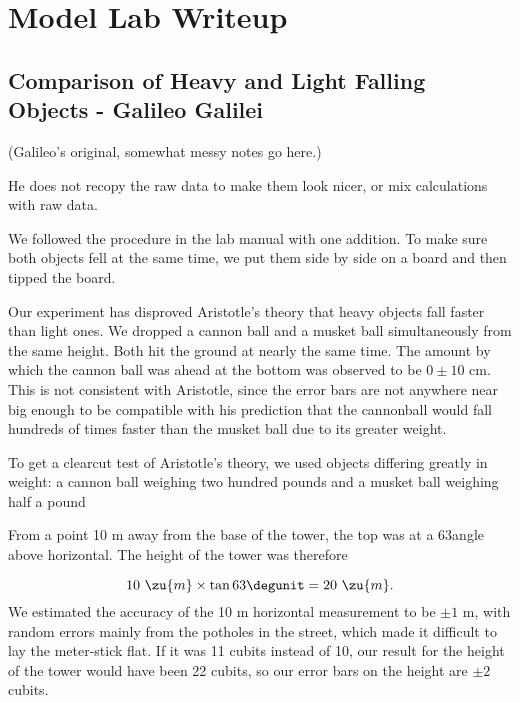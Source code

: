 \pagebreak[4]

\section*{Model Lab Writeup}

\subsection*{Comparison of Heavy and Light Falling Objects - Galileo Galilei}

(Galileo's original, somewhat messy notes go here.)

He does not recopy the raw data to make them look nicer, or
mix calculations with raw data.

       We followed the procedure in the lab manual with one addition.
To make sure both objects fell at
the same time, we put them side by side on a board and then
tipped the board.

Our experiment has disproved Aristotle's theory that heavy objects
fall faster than light ones.
We dropped a cannon ball
and a musket ball simultaneously from
the same height. Both hit the ground at nearly the same
time. The amount by which the cannon ball was ahead at the bottom
was observed to be $0\pm 10$ cm. This is not consistent with Aristotle,
since the error bars are not anywhere near big enough to be compatible
with his prediction that the cannonball would fall hundreds of times
faster than the musket ball due to its greater weight.

To get a clearcut test of Aristotle's theory, we used objects
differing greatly in weight:
a cannon ball weighing two hundred pounds
and a musket ball weighing half a pound

	From a point 10 m away from the base of the tower,
the top was at a 63\degunit angle above horizontal. The
height of the tower was therefore

\begin{equation*}
		10\ \zu{m} \times \tan  63\degunit  =  20\ \zu{m}  .  
\end{equation*}
We estimated the accuracy of the 10 m horizontal
measurement to be $\pm 1$ m, with random errors mainly from
the potholes in the street, which made it difficult to lay
the meter-stick flat. If it was 11 cubits instead of 10,
our result for the height of the tower would have been 22
cubits, so our error bars on the height are $\pm 2$ cubits.

